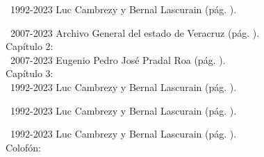 \documentclass[14pt,twoside,final]{extbook} %
\begin{document}
\noindent\textcopyright\ 1992-2023 Luc Cambrezy y Bernal Lascurain (pág. \pageref{fig:jalacingo-principios-xx}).

\noindent\textcopyright\ 2007-2023 Archivo General del estado de Veracruz (pág. \pageref{fig:progreso-industrial}). \\

\noindent Capítulo 2: \\

\noindent\textcopyright\ 2007-2023 Eugenio Pedro José Pradal Roa (pág. \pageref{fig:jalacingo-photo}). \\

\noindent Capítulo 3: \\

\noindent\textcopyright\ 1992-2023 Luc Cambrezy y Bernal Lascurain (pág. \pageref{fig:hda-limon}).

\noindent\textcopyright\ 1992-2023 Luc Cambrezy y Bernal Lascurain (pág. \pageref{fig:hda-cuatotolapam}).

\noindent\textcopyright\ 1992-2023 Luc Cambrezy y Bernal Lascurain (pág. \pageref{fig:hda-tenextepec}). \\

\noindent Colofón: \\
\end{document}
